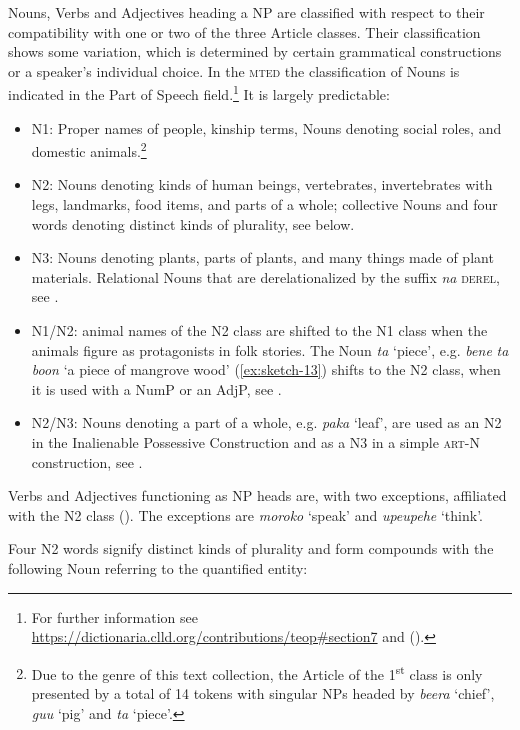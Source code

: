 \documentclass[output=paper]{langscibook}
\begin{document}
Nouns, Verbs and Adjectives heading a NP are classified with respect to their compatibility with one or two of the three Article classes. Their classification shows some variation, which is determined by certain grammatical constructions or a speaker's individual choice. In the \textsc{mted} the classification of Nouns is indicated in the Part of Speech field.\footnote{For further information see \url{https://dictionaria.clld.org/contributions/teop\#section7} and (\cite{Mosel:2014kg}).} It is largely predictable:

\begin{itemize}
    \item N1: Proper names of people, kinship terms, Nouns denoting social roles, and domestic animals.\footnote{Due to the genre of this text collection, the Article of the 1\textsuperscript{st} class is only presented by a total of 14 tokens with singular NPs headed by \textit{beera} `chief', \textit{guu} `pig' and \textit{ta} `piece'.}
    \item N2: Nouns denoting kinds of human beings, vertebrates, invertebrates with legs, landmarks, food items, and parts of a whole; collective Nouns and four words denoting distinct kinds of plurality, see below.
    \item N3: Nouns denoting plants, parts of plants, and many things made of plant materials. Relational Nouns that are derelationalized by the suffix \textit{na} \textsc{derel}, see .
    \item N1/N2: animal names of the N2 class are shifted to the N1 class when the animals figure as protagonists in folk stories. The Noun \textit{ta} `piece', e.g. \textit{bene} \textit{ta} \textit{boon} `a piece of mangrove wood' (\ref{ex:sketch-13}) shifts to the N2 class, when it is used with a NumP or an AdjP, see .
    \item N2/N3: Nouns denoting a part of a whole, e.g. \textit{paka} `leaf', are used as an N2 in the Inalienable Possessive Construction and as a N3 in a simple \textsc{art}-N construction, see .
\end{itemize}

Verbs and Adjectives functioning as NP heads are, with two exceptions, affiliated with the N2 class (\cite[274--277, 279]{Mosel:2017as}). The exceptions are \textit{moroko} `speak' and \textit{upeupehe} `think'.

Four N2 words signify distinct kinds of plurality and form compounds with the following Noun referring to the quantified entity:
\end{document}
